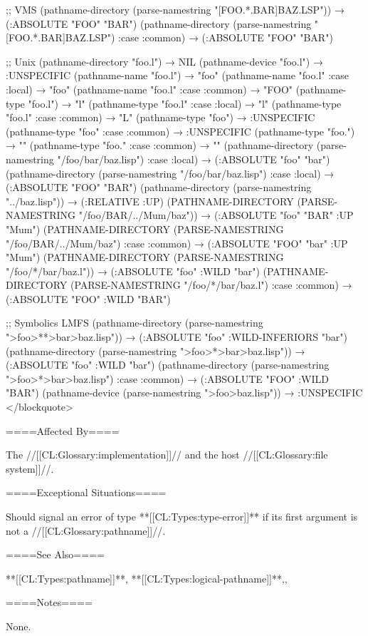 ;; VMS (pathname-directory (parse-namestring "[FOO.*.BAR]BAZ.LSP")) → (:ABSOLUTE "FOO" "BAR") (pathname-directory (parse-namestring "[FOO.*.BAR]BAZ.LSP") :case :common) → (:ABSOLUTE "FOO" "BAR")

;; Unix (pathname-directory "foo.l") → NIL (pathname-device "foo.l") → :UNSPECIFIC (pathname-name "foo.l") → "foo" (pathname-name "foo.l" :case :local) → "foo" (pathname-name "foo.l" :case :common) → "FOO" (pathname-type "foo.l") → "l" (pathname-type "foo.l" :case :local) → "l" (pathname-type "foo.l" :case :common) → "L" (pathname-type "foo") → :UNSPECIFIC (pathname-type "foo" :case :common) → :UNSPECIFIC (pathname-type "foo.") → "" (pathname-type "foo." :case :common) → "" (pathname-directory (parse-namestring "/foo/bar/baz.lisp") :case :local) → (:ABSOLUTE "foo" "bar") (pathname-directory (parse-namestring "/foo/bar/baz.lisp") :case :local) → (:ABSOLUTE "FOO" "BAR") (pathname-directory (parse-namestring "../baz.lisp")) → (:RELATIVE :UP) (PATHNAME-DIRECTORY (PARSE-NAMESTRING "/foo/BAR/../Mum/baz")) → (:ABSOLUTE "foo" "BAR" :UP "Mum") (PATHNAME-DIRECTORY (PARSE-NAMESTRING "/foo/BAR/../Mum/baz") :case :common) → (:ABSOLUTE "FOO" "bar" :UP "Mum") (PATHNAME-DIRECTORY (PARSE-NAMESTRING "/foo/*/bar/baz.l")) → (:ABSOLUTE "foo" :WILD "bar") (PATHNAME-DIRECTORY (PARSE-NAMESTRING "/foo/*/bar/baz.l") :case :common) → (:ABSOLUTE "FOO" :WILD "BAR")

;; Symbolics LMFS (pathname-directory (parse-namestring ">foo>**>bar>baz.lisp")) → (:ABSOLUTE "foo" :WILD-INFERIORS "bar") (pathname-directory (parse-namestring ">foo>*>bar>baz.lisp")) → (:ABSOLUTE "foo" :WILD "bar") (pathname-directory (parse-namestring ">foo>*>bar>baz.lisp") :case :common) → (:ABSOLUTE "FOO" :WILD "BAR") (pathname-device (parse-namestring ">foo>baz.lisp")) → :UNSPECIFIC </blockquote>

====Affected By====

The //[[CL:Glossary:implementation]]// and the host //[[CL:Glossary:file system]]//.

====Exceptional Situations====

Should signal an error of type **[[CL:Types:type-error]]** if its first argument is not a //[[CL:Glossary:pathname]]//.

====See Also====

**[[CL:Types:pathname]]**, **[[CL:Types:logical-pathname]]**,{\secref\FileSystemConcepts},

{\secref\PathnamesAsFilenames}

====Notes====

None.

         
